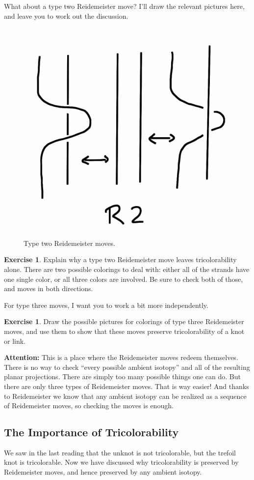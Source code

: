 \documentclass[12pt,letterpaper]{article}
\theoremstyle{definition}
\newtheorem{exercise}[question]{Exercise}
\begin{document}
What about a type two Reidemeister move?
I'll draw the relevant pictures here, and leave you to work out the discussion.

\begin{figure}[h!]
    \centering
    \includegraphics[width=.3\textwidth]{knotpics/r2.png}
    \caption{Type two Reidemeister moves.}
\end{figure}


\begin{exercise}
Explain why a type two Reidemeister move leaves tricolorability alone.
There are two possible colorings to deal with: either all of the strands have one single color, or all three colors are involved.
Be sure to check both of those, and moves in both directions.
\end{exercise}

For type three moves, I want you to work a bit more independently.

\begin{exercise}
Draw the possible pictures for colorings of type three Reidemeister moves, and use them to show that these moves preserve tricolorability of a knot or link.
\end{exercise}

\textbf{Attention:} This is a place where the Reidemeister moves redeem themselves.
There is no way to check ``every possible ambient isotopy'' and all of the resulting planar projections.
There are simply too many possible things one can do.
But there are only three types of Reidemeister moves.
That is way easier!
And thanks to Reidemeister we know that any ambient isotopy can be realized as a sequence of Reidemeister moves, so checking the moves is enough.

\subsection*{The Importance of Tricolorability}

We saw in the last reading that the unknot is not tricolorable, but the trefoil knot is tricolorable.
Now we have discussed why tricolorability is preserved by Reidemeister moves, and hence preserved by any ambient isotopy.
\end{document}
